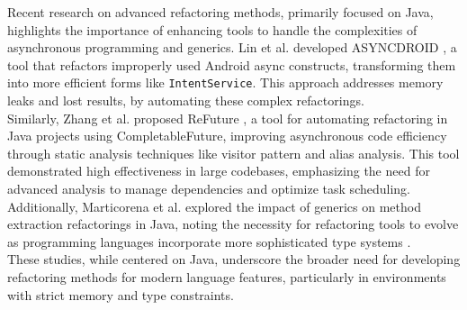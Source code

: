 Recent research on advanced refactoring methods, primarily focused on Java,
highlights the importance of enhancing tools to handle the complexities of
asynchronous programming and generics. Lin et al. developed ASYNCDROID \cite{AndroidAsncRefactoring}, a tool
that refactors improperly used Android async constructs, transforming them into
more efficient forms like \verb|IntentService|. This approach
addresses memory leaks and lost results, by automating these complex refactorings. \\
Similarly, Zhang et al. proposed ReFuture \cite{AutomaticRefactoringAsyncJAVA}, a tool for automating refactoring in
Java projects using CompletableFuture, improving asynchronous code efficiency
through static analysis techniques like visitor pattern and alias
analysis. This tool demonstrated high effectiveness in large
codebases, emphasizing the need for advanced analysis to manage dependencies and
optimize task scheduling. \\
Additionally, Marticorena et al. explored the impact of generics on method
extraction refactorings in Java, noting the necessity for refactoring tools to
evolve as programming languages incorporate more sophisticated type
systems \cite{GenericRefactoringJAVA}. \\
These studies, while centered on Java, underscore the broader need for
developing refactoring methods for modern language features, particularly in
environments with strict memory and type constraints.